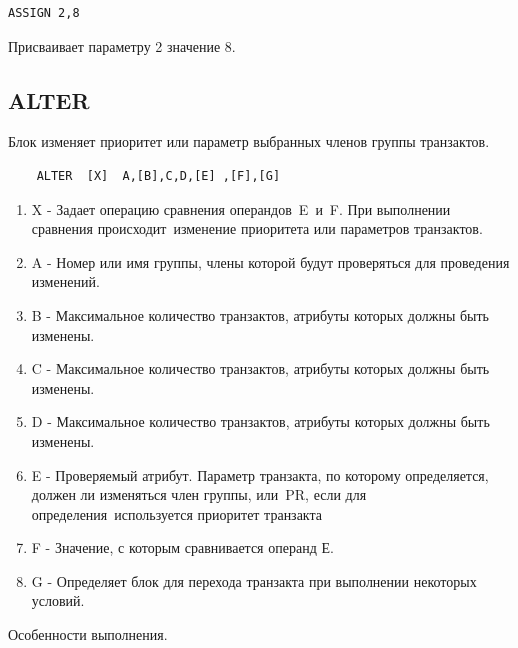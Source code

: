 \documentclass[14pt]{extarticle}
\begin{document}
\begin{lstlisting}
ASSIGN 2,8
\end{lstlisting}

Присваивает параметру 2 значение 8.

\subsection*{ALTER}

Блок изменяет приоритет или параметр выбранных членов группы транзактов.

\begin{lstlisting}
	ALTER  [X]  A,[B],C,D,[E] ,[F],[G]
\end{lstlisting}

\begin{enumerate}
	\item X - Задает операцию сравнения операндов E и F. При выполнении сравнения происходит изменение приоритета или параметров транзактов.
	\item A - Номер или имя группы, члены которой будут проверяться для проведения изменений.
	\item B - Максимальное количество транзактов, атрибуты которых должны быть изменены.
	\item C - Максимальное количество транзактов, атрибуты которых должны быть изменены.
	\item D - Максимальное количество транзактов, атрибуты которых должны быть изменены.
	\item E - Проверяемый атрибут. Параметр транзакта, по которому определяется, должен ли изменяться член группы, или PR, если для определения используется приоритет транзакта
	\item F - Значение, с которым сравнивается операнд Е.
	\item G - Определяет блок для перехода транзакта при выполнении некоторых условий. 
\end{enumerate}

Особенности выполнения.
\end{document}

